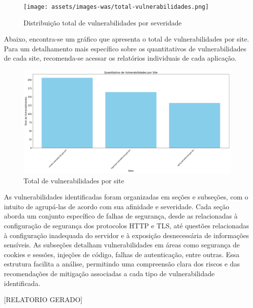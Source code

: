 \documentclass[a4paper,12pt]{article}
\begin{document}
\begin{figure}[h!]
    \centering
    \texttt{[image: assets/images-was/total-vulnerabilidades.png]}
    \caption{Distribuição total de vulnerabilidades por severidade}
\end{figure}
\FloatBarrier

Abaixo, encontra-se um gráfico que apresenta o total de vulnerabilidades por site. Para um detalhamento mais específico sobre os quantitativos de vulnerabilidades de cada site, recomenda-se acessar os relatórios individuais de cada aplicação.

\begin{figure}[h!]
    \centering
    \includegraphics[width=1.0\textwidth]{assets/images-was/vulnerabilidades-x-site.png}
    \caption{Total de vulnerabilidades por site}
\end{figure}
\FloatBarrier
As vulnerabilidades identificadas foram organizadas em seções e subseções, com o intuito de agrupá-las de acordo com sua afinidade e severidade. Cada seção aborda um conjunto específico de falhas de segurança, desde as relacionadas à configuração de segurança dos protocolos HTTP e TLS, até questões relacionadas à configuração inadequada do servidor e à exposição desnecessária de informações sensíveis. As subseções detalham vulnerabilidades em áreas como segurança de cookies e sessões, injeções de código, falhas de autenticação, entre outras. Essa estrutura facilita a análise, permitindo uma compreensão clara dos riscos e das recomendações de mitigação associadas a cada tipo de vulnerabilidade identificada.

[RELATORIO GERADO]
\end{document}
